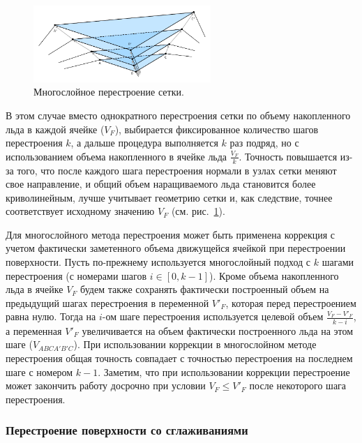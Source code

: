 \begin{figure}[ht]
\centering
\includegraphics[width=0.6\textwidth]{fig/3dr_classical_methods_multilayer_3d.pdf}
\singlespacing
{}\caption{Многослойное перестроение сетки.}
\label{fig:text_1_remesh3_multi}
\end{figure}

В этом случае вместо однократного перестроения сетки по объему накопленного льда в каждой ячейке ($V_F$), выбирается фиксированное количество шагов перестроения $k$, а дальше процедура выполняется $k$ раз подряд, но с использованием объема накопленного в ячейке льда $\frac{V_F}{k}$.
Точность повышается из-за того, что после каждого шага перестроения нормали в узлах сетки меняют свое направление, и общий объем наращиваемого льда становится более криволинейным, лучше учитывает геометрию сетки и, как следствие, точнее соответствует исходному значению $V_F$ (см. рис.~\ref{fig:text_1_remesh3_multi}).

Для многослойного метода перестроения может быть применена коррекция с учетом фактически заметенного объема движущейся ячейкой при перестроении поверхности.
Пусть по-прежнему используется многослойный подход с $k$ шагами перестроения (с номерами шагов $i \in [0, k - 1]$).
Кроме объема накопленного льда в ячейке $V_F$ будем также сохранять фактически построенный объем на предыдущий шагах перестроения в переменной $V'_F$, которая перед перестроением равна нулю.
Тогда на $i$-ом шаге перестроения используется целевой объем $\frac{V_F - V'_F}{k - i}$, а переменная $V'_F$ увеличивается на объем фактически построенного льда на этом шаге ($V_{ABCA'B'C}$).
При использовании коррекции в многослойном методе перестроения общая точность совпадает с точностью перестроения на последнем шаге с номером $k - 1$.
Заметим, что при использовании коррекции перестроение может закончить работу досрочно при условии $V_F \le V'_F$ после некоторого шага перестроения.

\subsubsection{Перестроение поверхности со сглаживаниями}\label{sec:tong_method}


